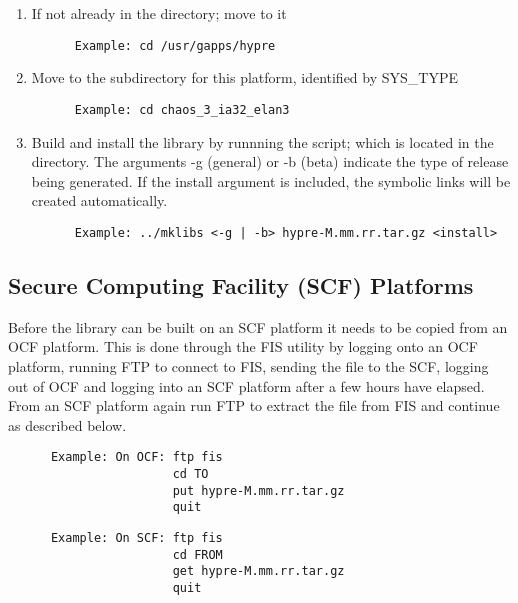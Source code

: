 \begin{enumerate}
\item If not already in the  directory; move to it
\begin{verbatim}
      Example: cd /usr/gapps/hypre
\end{verbatim}
\item Move to the subdirectory for this platform, identified by SYS\_TYPE
\begin{verbatim}
      Example: cd chaos_3_ia32_elan3
\end{verbatim}
\item Build and install the library by runnning the  script; which is
         located in the  directory.
      The arguments -g (general) or -b (beta) indicate the type of release being 
          generated.  If the install argument is included, the symbolic links will 
          be created automatically.
\begin{verbatim}
      Example: ../mklibs <-g | -b> hypre-M.mm.rr.tar.gz <install>
\end{verbatim}
\end{enumerate}

\subsection{Secure Computing Facility (SCF) Platforms}
\label{Secure Computing Facility (SCF) Platforms}

Before the \hypre{} library can be built on an SCF platform it needs to be 
copied from an OCF platform.  This is done through the FIS utility by logging
onto an OCF platform, running FTP to connect to FIS, sending the file to the SCF, 
logging out of OCF and logging into an SCF platform after a few hours have elapsed.
From an SCF platform again run FTP to extract the file from FIS and continue as
described below.
\begin{verbatim}
      Example: On OCF: ftp fis
                       cd TO
                       put hypre-M.mm.rr.tar.gz
                       quit
\end{verbatim}

\begin{verbatim}
      Example: On SCF: ftp fis
                       cd FROM
                       get hypre-M.mm.rr.tar.gz
                       quit
\end{verbatim}

